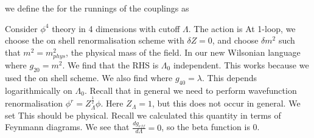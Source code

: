 \documentclass{article}
\begin{document}
we define the  for the runnings of the couplings as 

\begin{example}
Consider $\phi^4$ theory in 4 dimensions with cutoff $\Lambda$. The action is 
At 1-loop, we choose the on shell renormalisation scheme with $\delta Z=0$, and choose $\delta m^2$ such that $m^2 = m_{phys}^2$, the physical mass of the field. In our new Wilsonian language  
where $g_{20} = m^2$. We find that the RHS is $\Lambda_0$ independent. This works because we used the on shell scheme. We also find
where $g_{40}=\lambda$. This depends logarithmically on $\Lambda_0$. Recall that in general we need to perform wavefunction renormalisation $\phi^r = Z_\Lambda^\frac{1}{2} \phi$. Here $Z_\Lambda=1$, but this does not occur in general. We set 
This should be physical. Recall we calculated this quantity in terms of Feynmann diagrams. We see that $\frac{dg_{eff}}{d\Lambda} = 0$, so the beta function is 0. 
\end{example}

\end{document}
